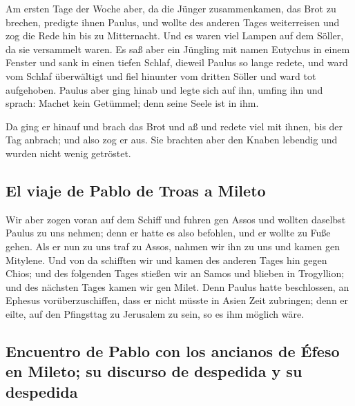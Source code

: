  Am ersten Tage der Woche aber, da die Jünger
zusammenkamen, das Brot zu brechen, predigte ihnen Paulus, und wollte
des anderen Tages weiterreisen und zog die Rede hin bis zu Mitternacht.
 Und es waren viel Lampen auf dem Söller, da sie
versammelt waren.  Es saß aber ein Jüngling mit namen
Eutychus in einem Fenster und sank in einen tiefen Schlaf, dieweil
Paulus so lange redete, und ward vom Schlaf überwältigt und fiel
hinunter vom dritten Söller und ward tot aufgehoben. 
Paulus aber ging hinab und legte sich auf ihn, umfing ihn und sprach:
Machet kein Getümmel; denn seine Seele ist in ihm.

 Da ging er hinauf und brach das Brot und aß und redete
viel mit ihnen, bis der Tag anbrach; und also zog er aus.
 Sie brachten aber den Knaben lebendig und wurden nicht
wenig getröstet.

\hypertarget{el-viaje-de-pablo-de-troas-a-mileto}{%
\subsection{El viaje de Pablo de Troas a
Mileto}\label{el-viaje-de-pablo-de-troas-a-mileto}}

 Wir aber zogen voran auf dem Schiff und fuhren gen Assos
und wollten daselbst Paulus zu uns nehmen; denn er hatte es also
befohlen, und er wollte zu Fuße gehen.  Als er nun zu uns
traf zu Assos, nahmen wir ihn zu uns und kamen gen Mitylene.
 Und von da schifften wir und kamen des anderen Tages hin
gegen Chios; und des folgenden Tages stießen wir an Samos und blieben in
Trogyllion; und des nächsten Tages kamen wir gen Milet. 
Denn Paulus hatte beschlossen, an Ephesus vorüberzuschiffen, dass er
nicht müsste in Asien Zeit zubringen; denn er eilte, auf den Pfingsttag
zu Jerusalem zu sein, so es ihm möglich wäre.

\hypertarget{encuentro-de-pablo-con-los-ancianos-de-uxe9feso-en-mileto-su-discurso-de-despedida-y-su-despedida}{%
\subsection{Encuentro de Pablo con los ancianos de Éfeso en Mileto; su
discurso de despedida y su
despedida}\label{encuentro-de-pablo-con-los-ancianos-de-uxe9feso-en-mileto-su-discurso-de-despedida-y-su-despedida}}


